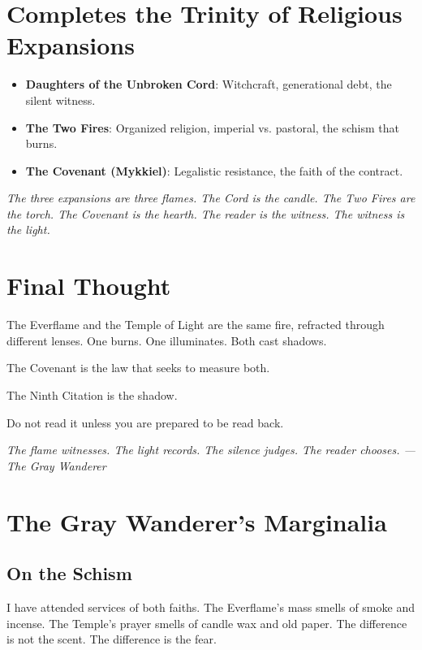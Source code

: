 \documentclass{book}
\newcommand{\citation}[1]{\textcolor{marginalia}{\small\textit{#1}}}
\begin{document}
\chapter{Completes the Trinity of Religious Expansions}

\begin{itemize}
\item \textbf{Daughters of the Unbroken Cord}: Witchcraft, generational debt, the silent witness.
\item \textbf{The Two Fires}: Organized religion, imperial vs. pastoral, the schism that burns.
\item \textbf{The Covenant (Mykkiel)}: Legalistic resistance, the faith of the contract.
\end{itemize}

\citation{The three expansions are three flames. The Cord is the candle. The Two Fires are the torch. The Covenant is the hearth. The reader is the witness. The witness is the light.}

\chapter{Final Thought}

The Everflame and the Temple of Light are the same fire, refracted through different lenses. One burns. One illuminates. Both cast shadows.

The Covenant is the law that seeks to measure both.

The Ninth Citation is the shadow.

Do not read it unless you are prepared to be read back.

\citation{The flame witnesses. The light records. The silence judges. The reader chooses. --- The Gray Wanderer}

\appendix

\chapter{The Gray Wanderer's Marginalia}

\section{On the Schism}

I have attended services of both faiths. The Everflame's mass smells of smoke and incense. The Temple's prayer smells of candle wax and old paper. The difference is not the scent. The difference is the fear.
\end{document}
